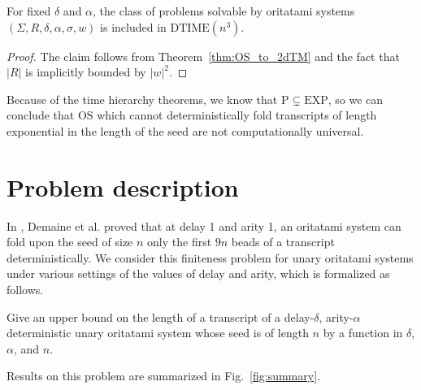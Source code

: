 \documentclass[runningheads]{llncs}
\begin{document}
\begin{corollary}
	For fixed $\delta$ and $\alpha$, the class of problems solvable by oritatami systems $(\Sigma, R, \delta, \alpha, \sigma, w)$ is included in $\mathrm{DTIME}(n^3)$.
\end{corollary}
\begin{proof}
	The claim follows from Theorem~\ref{thm:OS_to_2dTM} and the fact that $|R|$ is implicitly bounded by $|w|^2$.
\end{proof}



Because of the time hierarchy theorems, we know that $\mathrm{P}\subsetneq \mathrm{EXP}$, so we can conclude that OS which cannot deterministically fold transcripts of length exponential in the length of the seed are not computationally universal.

\section{Problem description}

In \cite{DemaineDNA24}, Demaine et al. proved that at delay 1 and arity 1, an oritatami system can fold upon the seed of size $n$ only the first $9n$ beads of a transcript deterministically. 
We consider this finiteness problem for unary oritatami systems under various settings of the values of delay and arity, which is formalized as follows. 

\begin{problem}\label{prob:det_unary_length}
Give an upper bound on the length of a transcript of a delay-$\delta$, arity-$\alpha$ deterministic unary oritatami system whose seed is of length $n$ by a function in $\delta$, $\alpha$, and $n$. 
\end{problem}



Results on this problem are summarized in Fig.~\ref{fig:summary}. 
\end{document}

